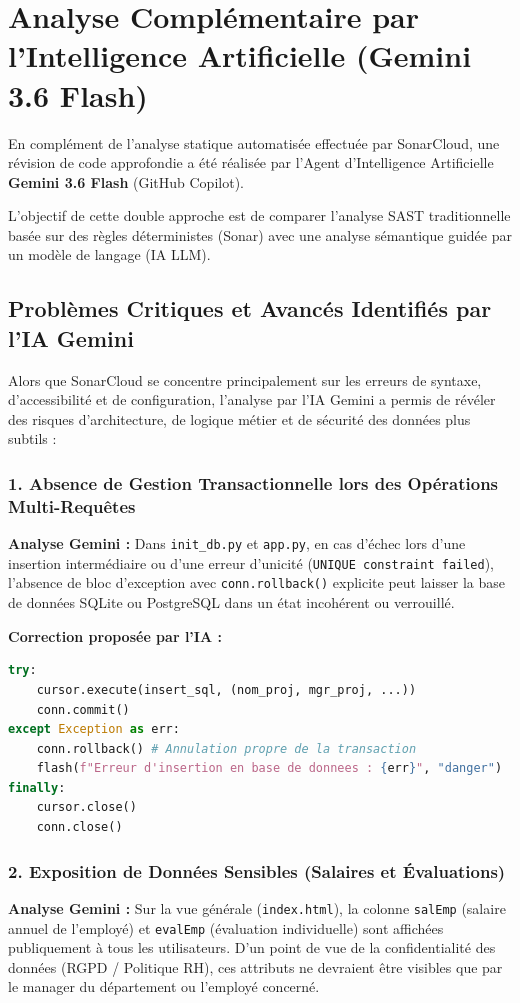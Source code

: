 \documentclass[12pt,a4paper]{article}
\begin{document}
\section{Analyse Complémentaire par l'Intelligence Artificielle (Gemini 3.6 Flash)}
En complément de l'analyse statique automatisée effectuée par SonarCloud, une révision de code approfondie a été réalisée par l'Agent d'Intelligence Artificielle \textbf{Gemini 3.6 Flash} (GitHub Copilot).

L'objectif de cette double approche est de comparer l'analyse SAST traditionnelle basée sur des règles déterministes (Sonar) avec une analyse sémantique guidée par un modèle de langage (IA LLM).

\subsection{Problèmes Critiques et Avancés Identifiés par l'IA Gemini}

Alors que SonarCloud se concentre principalement sur les erreurs de syntaxe, d'accessibilité et de configuration, l'analyse par l'IA Gemini a permis de révéler des risques d'architecture, de logique métier et de sécurité des données plus subtils :

\subsubsection{1. Absence de Gestion Transactionnelle lors des Opérations Multi-Requêtes}
\textbf{Analyse Gemini :} Dans \texttt{init\_db.py} et \texttt{app.py}, en cas d'échec lors d'une insertion intermédiaire ou d'une erreur d'unicité (\texttt{UNIQUE constraint failed}), l'absence de bloc d'exception avec \texttt{conn.rollback()} explicite peut laisser la base de données SQLite ou PostgreSQL dans un état incohérent ou verrouillé.

\textbf{Correction proposée par l'IA :}
\begin{lstlisting}[language=Python, caption=Gestion robuste des transactions avec try/except/rollback]
try:
    cursor.execute(insert_sql, (nom_proj, mgr_proj, ...))
    conn.commit()
except Exception as err:
    conn.rollback() # Annulation propre de la transaction
    flash(f"Erreur d'insertion en base de donnees : {err}", "danger")
finally:
    cursor.close()
    conn.close()
\end{lstlisting}

\subsubsection{2. Exposition de Données Sensibles (Salaires et Évaluations)}
\textbf{Analyse Gemini :} Sur la vue générale (\texttt{index.html}), la colonne \texttt{salEmp} (salaire annuel de l'employé) et \texttt{evalEmp} (évaluation individuelle) sont affichées publiquement à tous les utilisateurs. D'un point de vue de la confidentialité des données (RGPD / Politique RH), ces attributs ne devraient être visibles que par le manager du département ou l'employé concerné.
\end{document}
